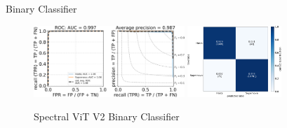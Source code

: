 \begin{frame}{Binary Classifier}
    \begin{figure}[t!]
        \centering
        \includegraphics[height=2.7cm]{figures/v2_real/vit_model_V2rocfull_binary_e26.png}
        \quad
        \includegraphics[height=2.7cm]{figures/v2_real/vit_model_V2cmfull_binary_e26.png}
        \caption{Spectral ViT V2 Binary Classifier\label{fig:v2_binary_qual}}
    \end{figure}
\end{frame}

